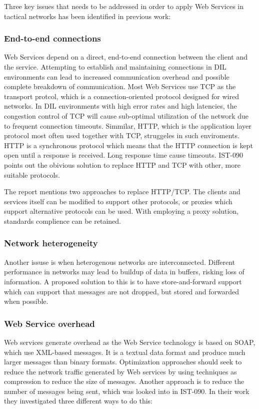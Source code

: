 \documentclass[USenglish]{ifimaster}
\begin{document}
Three key issues that needs to be addressed in order to apply Web Services in
tactical networks has been identified in previous work\cite{IST-118}\cite{IST-090}:
\label{section:DIL-problems}

\subsubsection{End-to-end connections}

Web Services depend on a direct, end-to-end connection between the client and
the service. Attempting to establish and maintaining connections in DIL
environments can lead to increased communication overhead and possible complete
breakdown of communication. Most Web Services use TCP as the transport protcol,
which is a connection-oriented protocol designed for wired networks. In DIL
environments with high error rates and high latencies, the congestion control of
TCP will cause sub-optimal utilization of the network due to frequent connection
timeouts. Simmilar, HTTP, which is the application layer protocol most often
used together with TCP, struggeles in such enviroments. HTTP is a synchronous
protocol which means that the HTTP connection is kept open until a response is
received. Long response time cause timeouts. IST-090 points out the obivious
solution to replace HTTP and TCP with other, more suitable protocols.

The report mentions two approaches to replace HTTP/TCP. The clients and services
itself can be modified to support other protocols, or proxies which support
alternative protocols can be used. With employing a proxy solution, standards
complience can be retained.


\subsubsection{Network heterogeneity}

Another issuse is when heterogenous networks are interconnected. Different
performance in networks may lead to buildup of data in buffers, risking loss of
information. A proposed solution to this is to have store-and-forward support
which can support that messages are not dropped, but stored and forwarded when
possible.


\subsubsection{Web Service overhead}

Web services generate overhead as the Web Service technology is based on SOAP,
which use XML-based messages. It is a textual data format and produce much
larger messages than binary formats. Optimization approaches should seek to
reduce the network traffic generated by Web services by using techniques as
compression to reduce the size of messages. Another approach is to reduce the
number of messages being sent, which was looked into in IST-090\cite{IST-090}. In
their work they investigated three different ways to do this:
\end{document}
